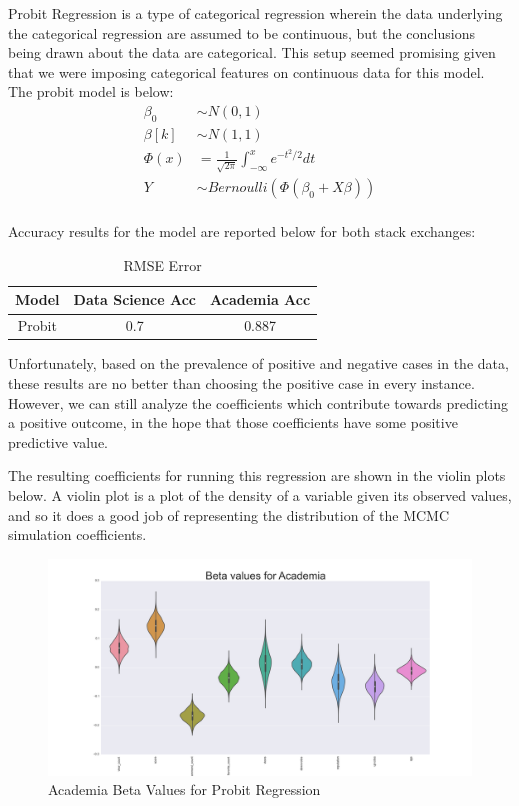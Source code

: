 \documentclass[12pt]{article}
\begin{document}
Probit Regression is a type of categorical regression wherein the data underlying the categorical regression are assumed to be continuous, but the conclusions being drawn about the data are categorical. This setup seemed promising given that we were imposing categorical features on continuous data for this model. The probit model is below: \\

\begin{align*}
\beta_0 & \sim N(0,1) \\
\beta[k] & \sim N(1,1)\\
\Phi(x) & = \frac{1}{\sqrt{2\pi}}\int_{-\infty}^{x}e^{-t^2/2}dt \\
Y & \sim Bernoulli(\Phi(\beta_0 + X \beta))\\
\end{align*}

Accuracy results for the model are reported below for both stack exchanges:

\begin{table}[ht]
  \centering
  \begin{tabular}{|c|c|c|}\hline
    Model & Data Science Acc & Academia Acc   \\ \hline
    Probit & 0.7 & 0.887 \\ \hline
  \end{tabular}
  \caption{RMSE Error}
  \label{probit_rmse}
\end{table}

Unfortunately, based on the prevalence of positive and negative cases in the data, these results are no better than choosing the positive case in every instance. However, we can still analyze the coefficients which contribute towards predicting a positive outcome, in the hope that those coefficients have some positive predictive value.

The resulting coefficients for running this regression are shown in the violin plots below. A violin plot is a plot of the density of a variable given its observed values, and so it does a good job of representing the distribution of the MCMC simulation coefficients. 

\begin{figure}[h]
  \centering
  \includegraphics[scale = 0.25]{academia_violin.png}
  \caption{Academia Beta Values for Probit Regression}
  \label{vp_academia}
\end{figure}
\end{document}
